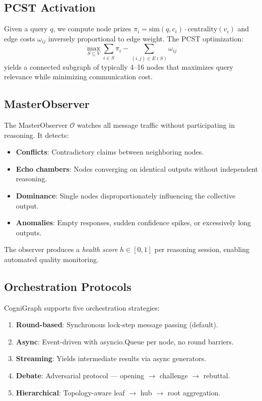 \documentclass[11pt,a4paper]{article}
\begin{document}
\subsection{PCST Activation}
Given a query $q$, we compute node prizes $\pi_i = \text{sim}(q, c_i) \cdot \text{centrality}(v_i)$ and edge costs $\omega_{ij}$ inversely proportional to edge weight. The PCST optimization:
\begin{equation}
    \max_{S \subseteq V} \sum_{i \in S} \pi_i - \sum_{(i,j) \in E(S)} \omega_{ij}
\end{equation}
yields a connected subgraph of typically 4--16 nodes that maximizes query relevance while minimizing communication cost.

\subsection{MasterObserver}
The MasterObserver $\mathcal{O}$ watches all message traffic without participating in reasoning. It detects:
\begin{itemize}
    \item \textbf{Conflicts}: Contradictory claims between neighboring nodes.
    \item \textbf{Echo chambers}: Nodes converging on identical outputs without independent reasoning.
    \item \textbf{Dominance}: Single nodes disproportionately influencing the collective output.
    \item \textbf{Anomalies}: Empty responses, sudden confidence spikes, or excessively long outputs.
\end{itemize}

The observer produces a \textit{health score} $h \in [0,1]$ per reasoning session, enabling automated quality monitoring.

\subsection{Orchestration Protocols}
CogniGraph supports five orchestration strategies:
\begin{enumerate}
    \item \textbf{Round-based}: Synchronous lock-step message passing (default).
    \item \textbf{Async}: Event-driven with asyncio.Queue per node, no round barriers.
    \item \textbf{Streaming}: Yields intermediate results via async generators.
    \item \textbf{Debate}: Adversarial protocol --- opening $\to$ challenge $\to$ rebuttal.
    \item \textbf{Hierarchical}: Topology-aware leaf $\to$ hub $\to$ root aggregation.
\end{enumerate}
\end{document}
